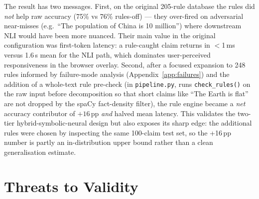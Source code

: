 \documentclass[12pt, a4paper, oneside]{report}
\begin{document}
The result has two messages. First, on the original 205-rule database the rules did \emph{not} help raw accuracy (75\% vs 76\% rules-off) --- they over-fired on adversarial near-misses (e.g.\ ``The population of China is 10 million'') where downstream NLI would have been more nuanced. Their main value in the original configuration was first-token latency: a rule-caught claim returns in $<$1\,ms versus 1.6\,s mean for the NLI path, which dominates user-perceived responsiveness in the browser overlay. Second, after a focused expansion to 248 rules informed by failure-mode analysis (Appendix~\ref{app:failures}) and the addition of a whole-text rule pre-check (in \texttt{pipeline.py}, runs \texttt{check\_rules()} on the raw input before decomposition so that short claims like ``The Earth is flat'' are not dropped by the spaCy fact-density filter), the rule engine became a \emph{net} accuracy contributor of $+16$\,pp \emph{and} halved mean latency. This validates the two-tier hybrid-symbolic-neural design but also exposes its sharp edge: the additional rules were chosen by inspecting the same 100-claim test set, so the +16\,pp number is partly an in-distribution upper bound rather than a clean generalisation estimate.

\section{Threats to Validity}
\end{document}
